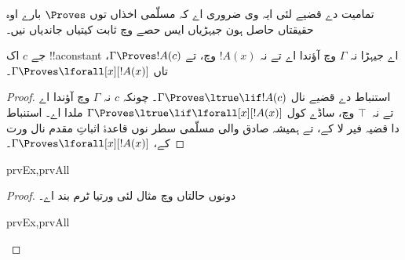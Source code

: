 \documentclass[../../../include/open-logic-section]{subfiles}
\begin{document}


\begin{explain}
  تمامیت دے قضیے لئی ایہ وی ضروری اے کہ مسلّمی اخذاں توں
  $\Proves$ بارے اوہ حقیقتاں حاصل ہون جیہڑیاں ایس حصے وچ
  ثابت کیتیاں جاندیاں نیں۔
\end{explain}

\begin{thm}
 جے $c$ اک !!a{constant} اے جیہڑا
نہ $\Gamma$ وچ آؤندا اے تے نہ $!A(x)$ وچ، تے $\Gamma \Proves !A(c)$،
تاں $\Gamma \Proves \lforall[x][!A(x)]$۔
\end{thm}

\begin{proof}
استنباط دے قضیے نال $\Gamma \Proves \ltrue \lif !A(c)$۔ چونکہ
$c$ نہ $\Gamma$ وچ آؤندا اے تے نہ~$\top$ وچ، ساڈے کول $\Gamma \Proves
\ltrue \lif \lforall[x][!A(x)]$ ملدا اے۔ استنباط دا قضیہ فیر لا کے،
تے ہمیشہ صادق والی مسلّمی سطر نوں قاعدۂ اثباتِ مقدم نال ورت کے،
$\Gamma \Proves \lforall[x][!A(x)]$۔
\end{proof}

\begin{prop}
\begin{tagenumerate}{prvEx,prvAll}

\end{tagenumerate}
\end{prop}

\begin{proof}
دونوں حالتاں وچ مثال لئی ورتیا ٹرم بند اے۔
\begin{tagenumerate}{prvEx,prvAll}
\end{tagenumerate}
\end{proof}
\end{document}
